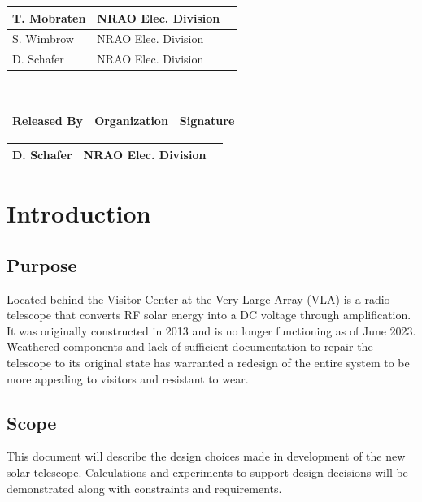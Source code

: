 \documentclass[titlepage]{article}
\renewcommand{\arraystretch}{1.4}
\begin{document}
\begin{titlepage}
\begin{center}
\begin{tabular}{|m{3cm}|m{3.5cm}|m{6.93cm}|}
        T. Mobraten & NRAO Elec. Division &  \\ 
        \hline
        S. Wimbrow & NRAO Elec. Division &  \\ 
        \hline
        D. Schafer & NRAO Elec. Division &  \\ 
        \hline
    \end{tabular} \\
    \renewcommand{\arraystretch}{1}
    \vspace*{1cm}
    \begin{tabular}{|m{3cm}|m{3.5cm}|m{6.93cm}|} \hline
        \rowcolor{nraoblue}
        \textbf{Released By} & \textbf{Organization} & \textbf{Signature} \\ \hline
    \end{tabular}
    \renewcommand{\arraystretch}{2}
    \begin{tabular}{|m{3cm}|m{3.5cm}|m{6.93cm}|}
        D. Schafer & NRAO Elec. Division &  \\ 
        \hline
    \end{tabular}
    \renewcommand{\arraystretch}{1}
\end{center}
\end{titlepage}


\tableofcontents
\listoffigures
\thispagestyle{fancy}
\newpage

\section{Introduction}

\subsection{Purpose}
Located behind the Visitor Center at the Very Large Array (VLA) is a radio telescope that converts RF solar energy into a DC voltage through amplification. It was originally constructed in 2013 and is no longer functioning as of June 2023. Weathered components and lack of sufficient documentation to repair the telescope to its original state has warranted a redesign of the entire system to be more appealing to visitors and resistant to wear.

\subsection{Scope}
This document will describe the design choices made in development of the new solar telescope. Calculations and experiments to support design decisions will be demonstrated along with constraints and requirements.
\end{document}
